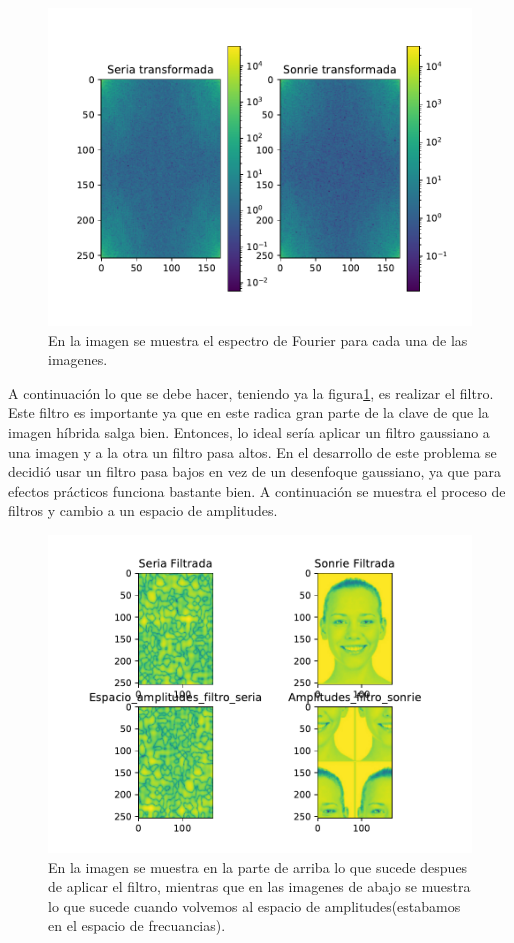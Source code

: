 \documentclass{article}
\begin{document}
\begin{figure}[H]
    \centering
    \includegraphics[width=\textwidth]{FFtIm.pdf}
    \caption{En la imagen se muestra el espectro de Fourier para cada una de las imagenes.}
    \label{fig:FFT}
\end{figure}

A continuación lo que se debe hacer, teniendo ya la figura\ref{fig:FFT}, es realizar el filtro. Este filtro es importante ya que en este radica gran parte de la clave de que la imagen híbrida salga bien. Entonces, lo ideal sería aplicar un filtro gaussiano a una imagen y a la otra un filtro pasa altos. En el desarrollo de este problema se decidió usar un filtro pasa bajos en vez de un desenfoque gaussiano, ya que para efectos prácticos funciona bastante bien. A continuación se muestra el proceso de filtros y cambio a un espacio de amplitudes. 

\begin{figure}[H]
    \centering
    \includegraphics[width=\textwidth]{ImProceso.pdf}
    \caption{En la imagen se muestra en la parte de arriba lo que sucede despues de aplicar el filtro, mientras que en las imagenes de abajo se muestra lo que sucede cuando volvemos al espacio de amplitudes(estabamos en el espacio de frecuancias).}
    \label{fig:pro}
\end{figure}
\end{document}
